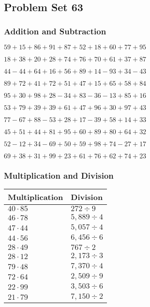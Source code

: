 \hypertarget{problem-set-63}{%
\subsection{Problem Set 63}\label{problem-set-63}}

\hypertarget{addition-and-subtraction}{%
\subsubsection{Addition and
Subtraction}\label{addition-and-subtraction}}

\(59+15+86+91+87+52+18+60+77+95\)

\(18+38+20+28+74+76+70+61+37+87\)

\(44-44+64+16+56+89+14-93+34-43\)

\(89+72+41+72+51+47+15+65+58+84\)

\(95+30+98+28-34+83-36-13+85+16\)

\(53+79+39+39+61+47+96+30+97+43\)

\(77-67+88-53+28+17-39+58+14+33\)

\(45+51+44+81+95+60+89+80+64+32\)

\(52-12+34-69+50+59+98+74-27+17\)

\(69+38+31+99+23+61+76+62+74+23\)

\hypertarget{multiplication-and-division}{%
\subsubsection{Multiplication and
Division}\label{multiplication-and-division}}

\begin{longtable}[]{@{}ll@{}}
\toprule
Multiplication & Division\tabularnewline
\midrule
\endhead
\(40\cdot85\) & \(272 ÷9\)\tabularnewline
\(46\cdot78\) & \(5,889÷4\)\tabularnewline
\(47\cdot44\) & \(5,057÷4\)\tabularnewline
\(44\cdot56\) & \(6,456÷6\)\tabularnewline
\(28\cdot49\) & \(767÷2\)\tabularnewline
\(28\cdot12\) & \(2,173÷3\)\tabularnewline
\(79\cdot48\) & \(7,370÷4\)\tabularnewline
\(72\cdot64\) & \(2,509÷9\)\tabularnewline
\(22\cdot99\) & \(3,503÷6\)\tabularnewline
\(21\cdot79\) & \(7,150÷2\)\tabularnewline
\bottomrule
\end{longtable}
